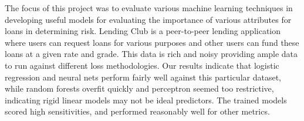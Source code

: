 The focus of this project was to evaluate various machine learning techniques in developing useful models for evaluating the importance of various attributes for loans in determining risk. 
Lending Club is a peer-to-peer lending application where users can request loans for various purposes and other users can fund these loans at a given rate and grade. This data is rich and noisy providing ample data to run against different loss methodologies. Our results indicate that logistic regression and neural nets perform fairly well against this particular dataset, while random forests overfit quickly and perceptron seemed too restrictive, indicating rigid linear models may not be ideal predictors. The trained models scored high sensitivities, and performed reasonably well for other metrics.